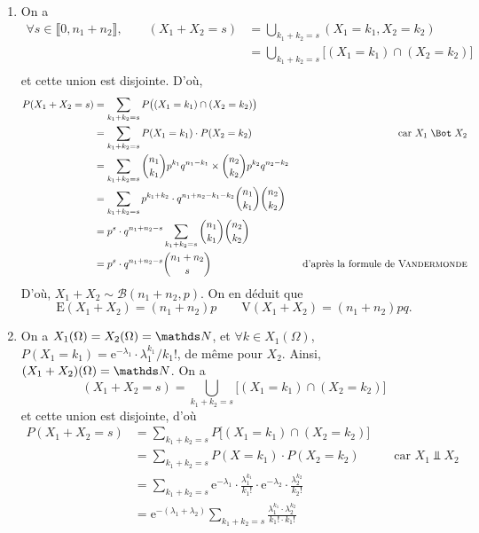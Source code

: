 \begin{exo}
	\begin{enumerate}
		\item On a
			\begin{align*}
				\forall s \in \llbracket 0, n_1 + n_2 \rrbracket,
				\quad\quad (X_1 + X_2 = s) &= \bigcup_{k_1 + k_2 = s} (X_1 = k_1, X_2 = k_2)\\
				&= \bigcup_{k_1 + k_2 = s} \big[(X_1 = k_1) \cap (X_2 = k_2)\big]\\
			\end{align*}
			et cette union est disjointe. D'où,
			\begin{align*}
				P(X_1 + X_2 = s) &= \sum_{k_1 + k_2 = s} P\big((X_1 = k_1) \cap (X_2 = k_2)\big)\\
				&= \sum_{k_1 + k_2 = s} P(X_1 = k_1) \cdot P(X_2 = k_2) & \text{ car } X_1 \mathrel{\Bot} X_2 \\
				&= \sum_{k_1+k_2 = s} {n_1\choose k_1} p^{k_1} q^{n_1 - k_1} \times {n_2\choose k_2} p^{k_2} q^{n_2 - k_2}  \\
				&= \sum_{k_1 + k_2 = s} p^{k_1 + k_2} \cdot q^{n_1 + n_2 - k_1 - k_2} {n_1\choose k_1} {n_2 \choose k_2} \\
				&= p^s \cdot q^{n_1 + n_2 - s} \sum_{k_1 + k_2 = s} {n_1\choose k_1}{n_2\choose k_2} \\
				&= p^s \cdot q^{n_1 + n_2 - s} {n_1 + n_2 \choose s} &\text{ d'après la formule de \textsc{Vandermonde}}\\
			\end{align*}
			D'où, $X_1 + X_2 \sim \mathcal{B}(n_1 + n_2, p)$.
			On en déduit que \[
				\mathrm{E}(X_1 + X_2) = (n_1+n_2)p \quad\quad \mathrm{V}(X_1 + X_2) = (n_1+n_2) pq
			.\]
		\item On a $X_1(\Omega) = X_2(\Omega) = \N$, et $\forall k \in X_1(\Omega)$, $P(X_1 = k_1) = \mathrm{e}^{-\lambda_1} \cdot \lambda_1^{k_1} / k_1!$, de même pour $X_2$.
			Ainsi, $(X_1 + X_2)(\Omega) = \N$. On a \[
				(X_1 + X_2 = s) = \bigcup_{k_1 + k_2 = s} \big[(X_1 = k_1) \cap (X_2 = k_2)\big]
			\] et cette union est disjointe, d'où
			\begin{align*}
				P(X_1 + X_2 = s) &= \sum_{k_1 + k_2 = s} P\big[(X_1 = k_1) \cap (X_2 = k_2)\big]\\
				&= \sum_{k_1+k_2 = s} P(X = k_1) \cdot P(X_2 = k_2) && \text{ car } X_1 \mathrel{\Bot} X_2 \\
				&= \sum_{k_1 + k_2 = s} \mathrm{e}^{-\lambda_1} \cdot \frac{\lambda_1^{k_1}}{k_1!} \cdot \mathrm{e}^{-\lambda_2} \cdot \frac{\lambda_2^{k_2}}{k_2!} \\
				&= \mathrm{e}^{-(\lambda_1+\lambda_2)} \sum_{k_1 + k_2 = s} \frac{\lambda_1^{k_1} \cdot \lambda_2^{k_2}}{k_1! \cdot k_1!} \\

\end{align*}
\end{enumerate}
\end{exo}

